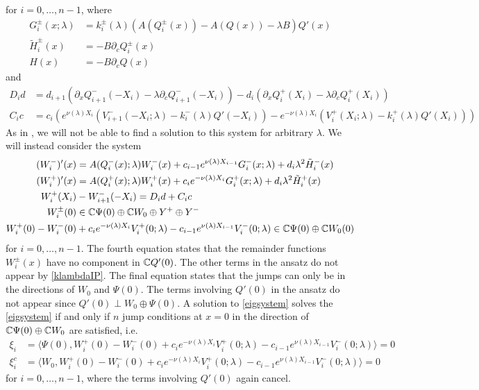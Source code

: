 \documentclass[10pt,reqno]{amsart}
\theoremstyle{plain}
\theoremstyle{definition}
\theoremstyle{remark}
\numberwithin{theorem}{section}
\numberwithin{equation}{section}
\begin{document}
for $i = 0, \dots, n-1$, where
\begin{equation}\label{defGH}
\begin{aligned}
G_i^\pm(x; \lambda) &= k_i^\pm(\lambda)\left( A(Q_i^\pm(x)) - A(Q(x)) - \lambda B \right) Q'(x) \\
\tilde{H}_i^\pm(x) &= -B \partial_c Q_i^\pm(x)\\
H(x) &= -B \partial_c Q(x)
\end{aligned}
\end{equation}
and
\begin{align}
D_i d &= d_{i+1}\left(\partial_x Q_{i+1}^-(-X_i) - \lambda \partial_c Q_{i+1}^-(-X_i)\right) - d_i \left( \partial_x Q_i^+(X_i) - \lambda \partial_c Q_i^+(X_i) \right) \label{defDid} \\
C_i c &= c_i \left( e^{\nu(\lambda) X_i} (V_{i+1}^-(-X_i; \lambda) - k_i^-(\lambda)Q'(-X_i)) - e^{-\nu(\lambda) X_i} (V_i^+(X_i; \lambda) - k_i^+(\lambda) Q'(X_i)) \right) \label{defCic}
\end{align}
As in \cite{Sandstede1998}, we will not be able to find a solution to this system for arbitrary $\lambda$. We will instead consider the system
\begin{equation}\label{eigsystem}
\begin{aligned}
(W_i^-)'(x) &= A(Q_i^-(x); \lambda) W_i^-(x) + c_{i-1} e^{\nu(\lambda)X_{i-1}}  G_i^-(x; \lambda) + d_i \lambda^2 \tilde{H}_i^-(x) \\
(W_i^+)'(x) &= A(Q_i^+(x); \lambda) W_i^+(x) + c_i e^{-\nu(\lambda)X_i}  G_i^+(x; \lambda) + d_i \lambda^2 \tilde{H}_i^+(x) \\
W_i^+(X_i) &- W_{i+1}^-(-X_i) = D_i d + C_i c \\
W_i^\pm(0) &\in \mathbb{C} \Psi(0) \oplus \mathbb{C} W_0 \oplus Y^+ \oplus Y^- \\
W_i^+(0) - W_i^-(0) &+ c_i e^{-\nu(\lambda)X_i}V_i^+(0; \lambda) - c_{i-1} e^{\nu(\lambda)X_{i-1}} V_i^-(0; \lambda) \in \mathbb{C} \Psi(0) \oplus \mathbb{C} W_0(0) 
\end{aligned}
\end{equation}
for $i = 0, \dots, n-1$. The fourth equation states that the remainder functions $W_i^\pm(x)$ have no component in $\mathbb{C} Q'(0)$. The other terms in the ansatz do not appear by \cref{klambdaIP}. The final equation states that the jumps can only be in the directions of $W_0$ and $\Psi(0)$. The terms involving $Q'(0)$ in the ansatz do not appear since $Q'(0) \perp W_0\oplus\Psi(0)$. A solution to \eqref{eigsystem} solves the \cref{eigsystem} if and only if $n$ jump conditions at $x = 0$ in the direction of $\mathbb{C} \Psi(0) \oplus \mathbb{C} W_0$ are satisfied, i.e.  
\begin{equation}\label{jumpxi1}
\begin{aligned}
\xi_i &= \langle \Psi(0), W_i^+(0) - W_i^-(0) + c_i e^{-\nu(\lambda)X_i}V_i^+(0; \lambda) - c_{i-1} e^{\nu(\lambda)X_{i-1}} V_i^-(0; \lambda) \rangle = 0  \\
\xi_i^c &= \langle W_0, W_i^+(0) - W_i^-(0) + c_i e^{-\nu(\lambda)X_i}V_i^+(0; \lambda) - c_{i-1} e^{\nu(\lambda)X_{i-1}} V_i^-(0; \lambda) \rangle = 0 
\end{aligned}
\end{equation}
for $i = 0, \dots, n-1$, where the terms involving $Q'(0)$ again cancel.
\end{document}
